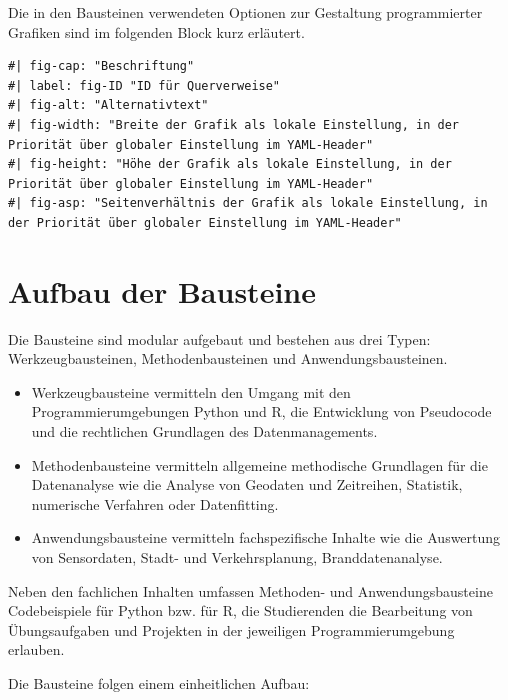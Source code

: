 \documentclass[
  letterpaper,
  DIV=11]{scrartcl}
\begin{document}
Die in den Bausteinen verwendeten Optionen zur Gestaltung programmierter
Grafiken sind im folgenden Block kurz erläutert.

\begin{verbatim}
#| fig-cap: "Beschriftung"
#| label: fig-ID "ID für Querverweise"
#| fig-alt: "Alternativtext"
#| fig-width: "Breite der Grafik als lokale Einstellung, in der Priorität über globaler Einstellung im YAML-Header"
#| fig-height: "Höhe der Grafik als lokale Einstellung, in der Priorität über globaler Einstellung im YAML-Header"
#| fig-asp: "Seitenverhältnis der Grafik als lokale Einstellung, in der Priorität über globaler Einstellung im YAML-Header"
\end{verbatim}

\section{Aufbau der Bausteine}\label{aufbau-der-bausteine}

Die Bausteine sind modular aufgebaut und bestehen aus drei Typen:
Werkzeugbausteinen, Methodenbausteinen und Anwendungsbausteinen.

\begin{itemize}
\item
  Werkzeugbausteine vermitteln den Umgang mit den Programmierumgebungen
  Python und R, die Entwicklung von Pseudocode und die rechtlichen
  Grundlagen des Datenmanagements.
\item
  Methodenbausteine vermitteln allgemeine methodische Grundlagen für die
  Datenanalyse wie die Analyse von Geodaten und Zeitreihen, Statistik,
  numerische Verfahren oder Datenfitting.
\item
  Anwendungsbausteine vermitteln fachspezifische Inhalte wie die
  Auswertung von Sensordaten, Stadt- und Verkehrsplanung,
  Branddatenanalyse.
\end{itemize}

Neben den fachlichen Inhalten umfassen Methoden- und Anwendungsbausteine
Codebeispiele für Python bzw. für R, die Studierenden die Bearbeitung
von Übungsaufgaben und Projekten in der jeweiligen Programmierumgebung
erlauben.

Die Bausteine folgen einem einheitlichen Aufbau:
\end{document}
